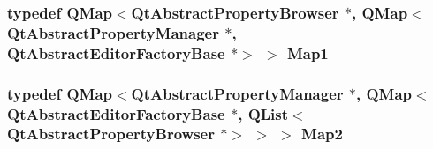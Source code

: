\subsubsection[{Map1}]{\setlength{\rightskip}{0pt plus 5cm}typedef Q\+Map$<${\bf Qt\+Abstract\+Property\+Browser} $\ast$, Q\+Map$<${\bf Qt\+Abstract\+Property\+Manager} $\ast$, {\bf Qt\+Abstract\+Editor\+Factory\+Base} $\ast$$>$ $>$ {\bf Map1}}\label{qtpropertybrowser_8cpp_ae5d5d6eb4fb6fd10907f8bdffbe0258c}
\subsubsection[{Map2}]{\setlength{\rightskip}{0pt plus 5cm}typedef Q\+Map$<${\bf Qt\+Abstract\+Property\+Manager} $\ast$, Q\+Map$<${\bf Qt\+Abstract\+Editor\+Factory\+Base} $\ast$, Q\+List$<${\bf Qt\+Abstract\+Property\+Browser} $\ast$$>$ $>$ $>$ {\bf Map2}}\label{qtpropertybrowser_8cpp_a96c9fe905ae8602ca83ff6622fe2ce81}
